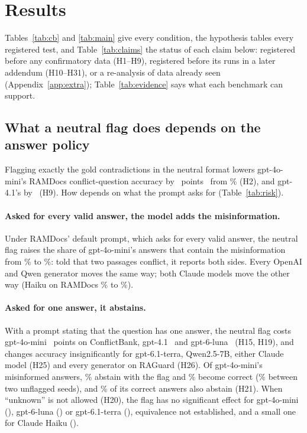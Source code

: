 \section{Results}
\label{sec:results}

Tables~\ref{tab:cb} and \ref{tab:main} give every condition, the hypothesis tables every registered test, and
Table~\ref{tab:claims} the status of each claim below: registered before any confirmatory data (H1--H9), registered before its
runs in a later addendum (H10--H31), or a re-analysis of data already seen (Appendix~\ref{app:extra});
Table~\ref{tab:evidence} says what each benchmark can support.

\subsection{What a neutral flag does depends on the answer policy}
\label{sec:neutral}


Flagging exactly the gold contradictions in the neutral format lowers gpt-4o-mini's RAMDocs conflict-question accuracy
by \adOracleFlagConf\ points \dOracleFlagConfCI\ from \plainConf\% (H2), and gpt-4.1's by \agptOracleFlagConf\ (H9).
How depends on what the prompt asks for (Table~\ref{tab:risk}).

\paragraph{Asked for every valid answer, the model adds the misinformation.} Under RAMDocs' default prompt, which asks
for every valid answer, the neutral flag raises the share of gpt-4o-mini's
answers that contain the misinformation from \zmRdMiniPlainWrong\% to \zmRdMiniOracleFlagWrong\%: told that two
passages conflict, it reports both sides. Every OpenAI and Qwen generator moves the same way; both Claude models move
the other way (Haiku on RAMDocs \zmRdHaikuPlainWrong\% to \zmRdHaikuOracleFlagWrong\%).

\paragraph{Asked for one answer, it abstains.} With a prompt stating that the question has one answer, the neutral
flag costs gpt-4o-mini \azSgMiniOracleFlagConflict\ points on ConflictBank, gpt-4.1 \azSgFourOracleFlagConflict\ and
gpt-6-luna \azSgLunaOracleFlagConflict\ (H15, H19), and changes accuracy insignificantly for gpt-6.1-terra,
Qwen2.5-7B, either Claude model (H25) and every generator on RAGuard (H26). Of gpt-4o-mini's misinformed answers, \trSgMiniNeutralMisinfoAbstain\% abstain with the flag and
\trSgMiniNeutralMisinfoCorrect\% become correct (\trNullSgMiniMisinfoCorrect\% between two unflagged seeds), and
\trSgMiniNeutralCorrectAbstain\% of its correct answers also abstain (H21). When ``unknown'' is not allowed (H20), the flag has no
significant effect for gpt-4o-mini (\hTwentyFcMiniFlag), gpt-6-luna (\hTwentyFcLunaFlag) or gpt-6.1-terra
(\hTwentyFcTerraFlag), equivalence not established, and a small one for Claude Haiku (\hTwentyFcHaikuFlag).

